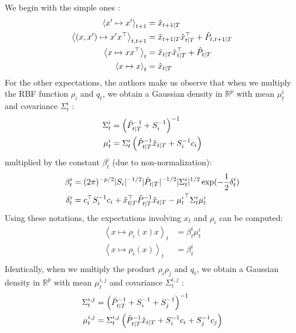 We begin with the simple ones :
\begin{align*}
  \left< x' \mapsto x'\right>_{t+1} &= \hat{x}_{t+1 \mathbin{\vert} T}\\
  \left< (x,x') \mapsto x'x^{\top}\right>_{t,t+1} &= \hat{x}_{t+1 \mathbin{\vert} T} \hat{x}_{t \mathbin{\vert} T}^{\top} + \hat{P}_{t,t+1 \mathbin{\vert} T}\\
  \left< x \mapsto xx^{\top}\right>_{t} &= \hat{x}_{t \mathbin{\vert} T} \hat{x}_{t \mathbin{\vert} T}^{\top} + \hat{P}_{t \mathbin{\vert} T}\\
  \left< x \mapsto x\right>_{t} &= \hat{x}_{t \mathbin{\vert} T}\\
\end{align*}
For the other expectations, the authors make us observe that when we multiply the RBF function $\rho_i$ and $q_t$, we obtain a Gaussian density in $\mathbb{R}^p$ with mean $\mu^i_t$ and covariance $\Sigma^i_t$ :
\begin{align*}
  \Sigma^i_t &= \left( \hat{P}_{t \mathbin{\vert} T}^{-1} + S_i^{-1} \right)^{-1}\\
  \mu^i_t &= \Sigma^i_t \left( \hat{P}_{t \mathbin{\vert} T}^{-1} \hat{x}_{t \mathbin{\vert} T} + S_i^{-1}c_i \right)\\
\end{align*}
multiplied by the constant $\beta^i_t$ (due to non-normalization):
\begin{align*}
  \beta^i_t &= (2\pi)^{-p/2} |S_i|^{-1/2} |\hat{P}_{t|T}|^{-1/2} |\Sigma^i_t|^{1/2} \exp(-\frac{1}{2} \delta^i_t)\\
  \delta^i_t &= c_i^{\top} S_i^{-1} c_i + \hat{x}_{t \mathbin{\vert} T}^{\top} \hat{P}_{t \mathbin{\vert} T}^{-1} \hat{x}_{t \mathbin{\vert} T} - {\mu^i_t}^{\top} \Sigma^i_t \mu^i_t\\
\end{align*}
Using these notations, the expectations involving $x_t$ and $\rho_i$ can be computed:
\begin{align*}
  \left< x \mapsto \rho_i(x) x \right>_{t} &= \beta^i_t \mu^i_t\\
  \left< x \mapsto \rho_i(x) \right>_{t} &= \beta^i_t\\
\end{align*}
Identically, when we multiply the product $\rho_i \rho_j$ and $q_t$, we obtain a Gaussian density in $\mathbb{R}^p$ with mean $\mu^{i,j}_t$ and covariance $\Sigma^{i,j}_t$ :
\begin{align*}
  \Sigma^{i,j}_t &= \left( \hat{P}_{t \mathbin{\vert} T}^{-1} + S_i^{-1} + S_j^{-1} \right)^{-1}\\
  \mu^{i,j}_t &= \Sigma^{i,j}_t \left( \hat{P}_{t \mathbin{\vert} T}^{-1} \hat{x}_{t \mathbin{\vert} T} + S_i^{-1}c_i + S_j^{-1}c_j \right)\\
\end{align*}
